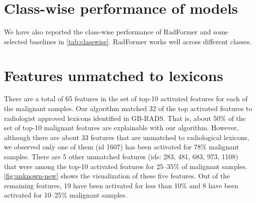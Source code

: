 \documentclass[twocolumn,final]{elsarticle}
\def\myarch{RadFormer\xspace}
\begin{document}
\section{Class-wise performance of models}
%
\begin{table}[h]
   \centering
    \caption{Class-wise performance of different models. We report the per-class accuracy for normal, benign, and malignant gallbladders.}
    \label{tab:classwise}
\end{table}

We have also reported the class-wise performance of \myarch and some selected baselines in \cref{tab:classwise}. \myarch works well across different classes. 

\section{Features unmatched to lexicons}
%
There are a total of 65 features in the set of top-10 activated features for each of the malignant samples. Our algorithm matched 32 of the top activated features to radiologist approved lexicons identified in GB-RADS. That is, about 50\% of the set of top-10 malignant features are explainable with our algorithm. However, although there are about 33 features that are unmatched to radiological lexicons, we observed only one of them (id 1607) has been activated for 78\% malignant samples. There are 5 other unmatched features (ids: 283, 481, 683, 973, 1108) that were among the top-10 activated features for 25--35\% of malignant samples. \cref{fig:unknown-new} shows the visualization of these five features. Out of the remaining features, 19 have been activated for less than 10\% and 8 have been activated for 10--25\% malignant samples.
\end{document}

